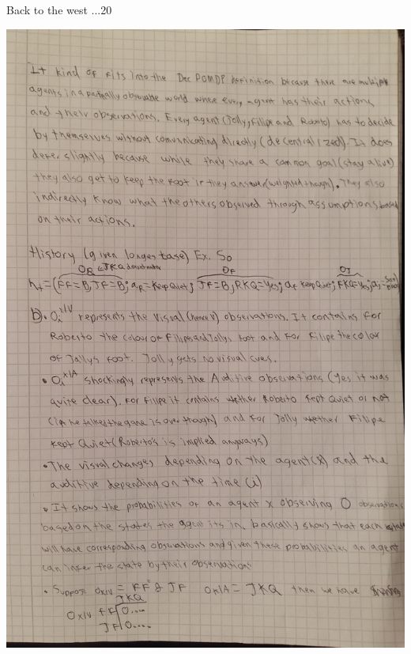 \begin{questions}
\begin{question}{Back to the west ...}{20}
\begin{answer}
	\includegraphics[scale=0.2]{p3.jpg}	
		\newpage


\end{answer}
\end{question}
\end{questions}
